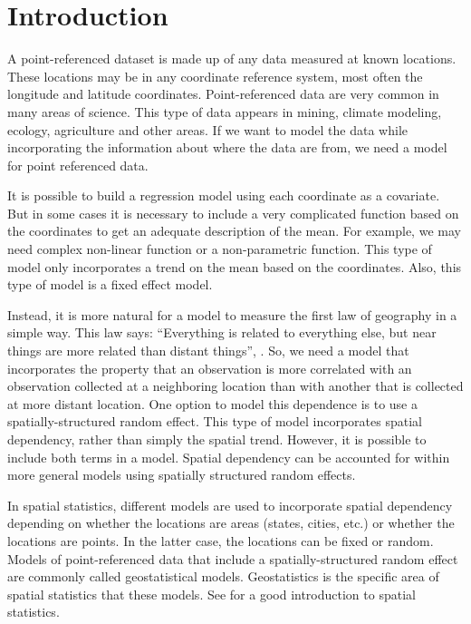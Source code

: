 
\chapter{Introduction} 

A point-referenced dataset is made up of any 
data measured at known locations. 
These locations may be in any coordinate reference system, 
most often the longitude and latitude coordinates. 
Point-referenced data are very common in 
many areas of science. 
This type of data appears in mining, climate modeling, 
ecology, agriculture and other areas. 
If we want to model the data while incorporating 
the information about where the data are from, 
we need a model for point referenced data. 

It is possible to build a regression model 
using each coordinate as a covariate. 
But in some cases it is necessary to include a very 
complicated function based on the coordinates to 
get an adequate description of the mean. 
For example, we may need complex non-linear function or 
a non-parametric function. 
This type of model only incorporates a
trend on the mean based on the coordinates. 
Also, this type of model is a fixed effect model. 

Instead, it is more natural for a model to measure 
the first law of geography in a simple way. 
This law says: ``Everything is related to everything else, 
but near things are more related than distant things'', 
\cite{tobler:1970}. 
So, we need a model that incorporates the property that an 
observation is more correlated with an observation 
collected at a neighboring location than with another that 
is collected at more distant location. 
One option to model this dependence is to use 
a spatially-structured random effect. 
This type of model incorporates spatial dependency, 
rather than simply the spatial trend. 
However, it is possible to include both terms in a model. 
Spatial dependency can be accounted for 
within more general models using 
spatially structured random effects. 

In spatial statistics, different models are used to incorporate 
spatial dependency depending on whether the locations are areas 
(states, cities, etc.) or whether the locations are points. 
In the latter case, the locations can be fixed or random. 
Models of point-referenced data that include a 
spatially-structured random effect are commonly called 
geostatistical models. 
Geostatistics is the specific area of spatial statistics 
that these models. 
See \cite{cressie:1993} for a good introduction to spatial statistics. 

